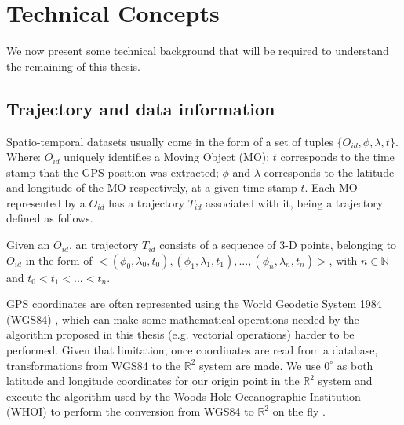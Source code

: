 \chapter{Technical Concepts}
\label{chp:techconcepts}

We now present some technical background that will be required to understand the remaining of this thesis.

\section{Trajectory and data information}
\label{sec:tech_data}

Spatio-temporal datasets usually come in the form of a set of tuples $\{O_{id}, \phi, \lambda, t\}$. Where: $O_{id}$
uniquely identifies a Moving Object (MO); $t$ corresponds to the time stamp that the GPS position was extracted; $\phi$
and $\lambda$ corresponds to the latitude and longitude of the MO respectively, at a given time stamp $t$. Each MO
represented by a $O_{id}$ has a trajectory $T_{id}$ associated with it, being a trajectory defined as follows.

\begin{Def}
Given an $O_{id}$, an trajectory $T_{id}$ consists of a sequence of 3-D points, belonging to $O_{id}$ in the form of
$<(\phi_0, \lambda_0, t_0), (\phi_1, \lambda_1, t_1), ..., (\phi_n, \lambda_n, t_n)>$, with $n \in \mathbb{N}$ and $t_0
< t_1 < ... < t_n$.
\end{Def}

GPS coordinates are often represented using the World Geodetic System 1984 (WGS84) \citep{wgs84}, which can make some
mathematical operations needed by the algorithm proposed in this thesis (e.g. vectorial operations) harder to be
performed. Given that limitation, once coordinates are read from a database, transformations from WGS84 to the
$\mathbb{R}^2$ system are made. We use $0^\circ$ as both latitude and longitude coordinates for our origin point in the
$\mathbb{R}^2$ system and execute the algorithm used by the Woods Hole Oceanographic Institution (WHOI) to perform the
conversion from WGS84 to $\mathbb{R}^2$ on the fly \citep{latlogtoxy}.


